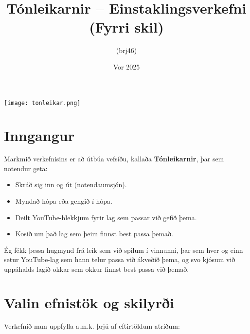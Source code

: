 \documentclass{article}
\title{Tónleikarnir – Einstaklingsverkefni (Fyrri skil)}
\author{(brj46)}
\date{Vor 2025}
\begin{document}
\maketitle

\vspace{2em}

\begin{center}
    \texttt{[image: tonleikar.png]}
\end{center}

\newpage

\section{Inngangur}
Markmið verkefnisins er að útbúa vefsíðu, kallaða \textbf{Tónleikarnir}, þar sem notendur geta:
\begin{itemize}
    \item Skráð sig inn og út (notendaumsjón).
    \item Myndað hópa eða gengið í hópa.
    \item Deilt YouTube-hlekkjum fyrir lag sem passar við gefið þema.
    \item Kosið um það lag sem þeim finnst best passa þemað. 
\end{itemize}

Ég fékk þessa hugmynd frá leik sem við spilum í vinnunni, þar sem hver og einn setur YouTube-lag sem hann telur passa við ákveðið þema, og svo kjósum við uppáhalds lagið okkar sem okkur finnst best passa við þemað.

\section{Valin efnistök og skilyrði}
Verkefnið mun uppfylla a.m.k. þrjú af eftirtöldum atriðum:
\end{document}
